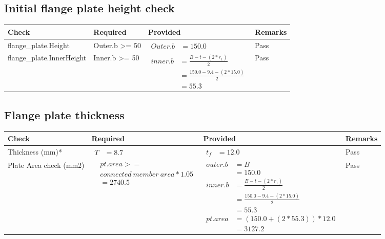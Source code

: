 \documentclass{article}%
\begin{document}
%
\newpage%
\subsection{Initial flange plate height check}%
\label{subsec:Initialflangeplateheightcheck}%
\renewcommand{\arraystretch}{1.2}%
\begin{longtable}{|p{4.5cm}|p{2.5cm}|p{7cm}|p{1.5cm}|}%
\hline%
\rowcolor{OsdagGreen}%
Check&Required&Provided&Remarks\\%
\hline%
\endhead%
\hline%
flange\_plate.Height&Outer.b >= 50&$\begin{aligned} Outer.b &=150.0\end{aligned}$&Pass\\%
\hline%
flange\_plate.InnerHeight&Inner.b >= 50&$\begin{aligned} inner.b &= \frac{B-t-(2*r_1)}{2}\\ &=\frac{150.0-9.4-(2*15.0)}{2}\\ &= 55.3\end{aligned}$&Pass\\%
\hline%
\end{longtable}

%
\newpage%
\subsection{Flange plate thickness}%
\label{subsec:Flangeplatethickness}%
\renewcommand{\arraystretch}{1.2}%
\begin{longtable}{|p{2.5cm}|p{4.5cm}|p{7cm}|p{1.5cm}|}%
\hline%
\rowcolor{OsdagGreen}%
Check&Required&Provided&Remarks\\%
\hline%
\endhead%
\hline%
Thickness (mm)*&$\begin{aligned} T &=8.7\end{aligned}$&$\begin{aligned} t_f &=12.0\end{aligned}$&Pass\\%
\hline%
Plate Area check (mm2)&$\begin{aligned} &pt.area >= \\&connected~member~area * 1.05\\  &= 2740.5\end{aligned}$&$\begin{aligned} outer.b &= B\\ &= 150.0 \\ inner.b &= \frac{B-t-(2*r_1)}{2}\\ &=\frac{150.0-9.4-(2*15.0)}{2}\\ &= 55.3 \\  pt.area &=(150.0+(2*55.3))*12.0\\ &= 3127.2\end{aligned}$&Pass\\%
\hline%
\end{longtable}
\end{document}
